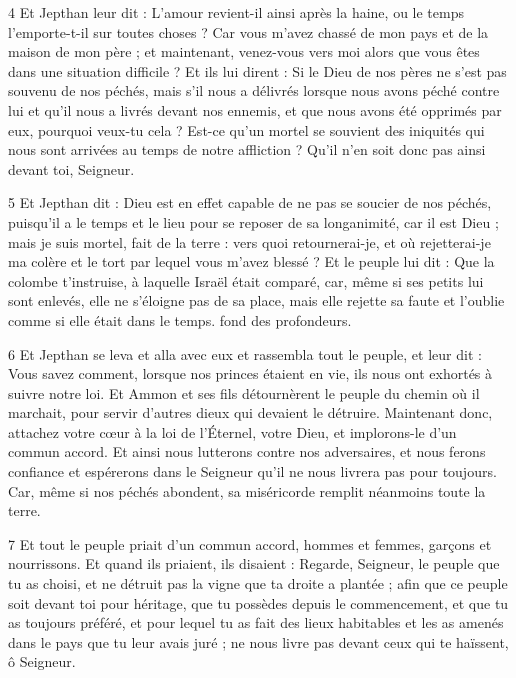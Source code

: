 \par 4 Et Jepthan leur dit : L'amour revient-il ainsi après la haine, ou le temps l'emporte-t-il sur toutes choses ? Car vous m'avez chassé de mon pays et de la maison de mon père ; et maintenant, venez-vous vers moi alors que vous êtes dans une situation difficile ? Et ils lui dirent : Si le Dieu de nos pères ne s'est pas souvenu de nos péchés, mais s'il nous a délivrés lorsque nous avons péché contre lui et qu'il nous a livrés devant nos ennemis, et que nous avons été opprimés par eux, pourquoi veux-tu cela ? Est-ce qu'un mortel se souvient des iniquités qui nous sont arrivées au temps de notre affliction ? Qu’il n’en soit donc pas ainsi devant toi, Seigneur.

\par 5 Et Jepthan dit : Dieu est en effet capable de ne pas se soucier de nos péchés, puisqu'il a le temps et le lieu pour se reposer de sa longanimité, car il est Dieu ; mais je suis mortel, fait de la terre : vers quoi retournerai-je, et où rejetterai-je ma colère et le tort par lequel vous m'avez blessé ? Et le peuple lui dit : Que la colombe t'instruise, à laquelle Israël était comparé, car, même si ses petits lui sont enlevés, elle ne s'éloigne pas de sa place, mais elle rejette sa faute et l'oublie comme si elle était dans le temps. fond des profondeurs.

\par 6 Et Jepthan se leva et alla avec eux et rassembla tout le peuple, et leur dit : Vous savez comment, lorsque nos princes étaient en vie, ils nous ont exhortés à suivre notre loi. Et Ammon et ses fils détournèrent le peuple du chemin où il marchait, pour servir d'autres dieux qui devaient le détruire. Maintenant donc, attachez votre cœur à la loi de l’Éternel, votre Dieu, et implorons-le d’un commun accord. Et ainsi nous lutterons contre nos adversaires, et nous ferons confiance et espérerons dans le Seigneur qu’il ne nous livrera pas pour toujours. Car, même si nos péchés abondent, sa miséricorde remplit néanmoins toute la terre.

\par 7 Et tout le peuple priait d'un commun accord, hommes et femmes, garçons et nourrissons. Et quand ils priaient, ils disaient : Regarde, Seigneur, le peuple que tu as choisi, et ne détruit pas la vigne que ta droite a plantée ; afin que ce peuple soit devant toi pour héritage, que tu possèdes depuis le commencement, et que tu as toujours préféré, et pour lequel tu as fait des lieux habitables et les as amenés dans le pays que tu leur avais juré ; ne nous livre pas devant ceux qui te haïssent, ô Seigneur.

